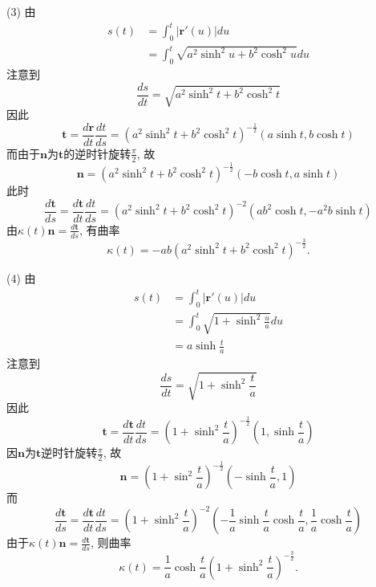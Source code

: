 \begin{tcolorbox}
(3)
由
\begin{equation*}
	\begin{split}
		s(t)
		&=\int_{0}^{t}|\boldsymbol{r}'(u)|du \\
		&=\int_{0}^{t}\sqrt{a^2\sinh^2u+b^2\cosh^2u}du
	\end{split}
\end{equation*}
注意到
\begin{equation*}
	\frac{ds}{dt}=\sqrt{a^2\sinh^2t+b^2\cosh^2t}
\end{equation*}
因此
\begin{equation*}
	\boldsymbol{t}=\frac{d\boldsymbol{r}}{dt}\frac{dt}{ds}
	=(a^2\sinh^2t+b^2\cosh^2t)^{-\frac{1}{2}}(a\sinh t,b \cosh t)
\end{equation*}
而由于$\boldsymbol{n}$为$\boldsymbol{t}$的逆时针旋转$\frac{\pi}{2}$,
故
\begin{equation*}
	\boldsymbol{n}=(a^2\sinh^2 t+b^2\cosh^2t)^{-\frac{1}{2}}(-b\cosh t, a\sinh t)
\end{equation*}
此时
\begin{equation*}
	\frac{d\boldsymbol{t}}{ds}=\frac{d\boldsymbol{t}}{dt}\frac{dt}{ds}
	=(a^2\sinh^2t+b^2\cosh^2t)^{-2}(ab^2\cosh t,-a^2b\sinh t)
\end{equation*}
由$\kappa (t)\boldsymbol{n}=\frac{d\boldsymbol{t}}{ds}$,
有曲率
\begin{equation*}
	\kappa(t) = -ab(a^2\sinh^2t+b^2\cosh^2t)^{-\frac{3}{2}}.
\end{equation*}

(4)
由
\begin{equation*}
	\begin{split}
		s(t)
		&= \int_{0}^{t}|\boldsymbol{r}'(u)|du \\
		&= \int_{0}^{t}\sqrt{1+\sinh^2\frac{u}{a}}du \\
		&= a\sinh \frac{t}{a}
	\end{split}
\end{equation*}
注意到
\begin{equation*}
	\frac{ds}{dt} = \sqrt{1+\sinh^2\frac{t}{a}}
\end{equation*}
因此
\begin{equation}
	\boldsymbol{t}=\frac{d\boldsymbol{t}}{dt}\frac{dt}{ds}
	=(1+\sinh^2\frac{t}{a})^{-\frac{1}{2}}(1,\sinh\frac{t}{a})
\end{equation}
因$\boldsymbol{n}$为$\boldsymbol{t}$逆时针旋转$\frac{\pi}{2}$,
故
\begin{equation*}
	\boldsymbol{n} = (1+\sin^{2}\frac{t}{a})^{-\frac{1}{2}}(-\sinh\frac{t}{a},1)
\end{equation*}
而
\begin{equation*}
	\frac{d\boldsymbol{t}}{ds}=\frac{d\boldsymbol{t}}{dt}\frac{dt}{ds}
	=(1+\sinh^2\frac{t}{a})^{-2}(-\frac{1}{a}\sinh\frac{t}{a}\cosh\frac{t}{a},\frac{1}{a}\cosh\frac{t}{a})
\end{equation*}
由于$\kappa (t)\boldsymbol{n}=\frac{d\boldsymbol{t}}{ds}$,
则曲率
\begin{equation*}
	\kappa(t)=\frac{1}{a}\cosh\frac{t}{a}(1+\sinh^2\frac{t}{a})^{-\frac{3}{2}}.
\end{equation*}
\end{tcolorbox}

